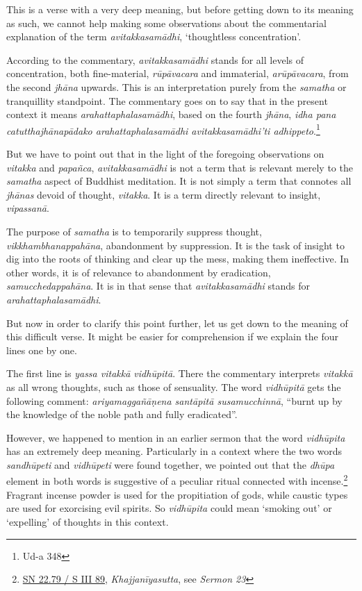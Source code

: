 This is a verse with a very deep meaning, but before getting down to its meaning as such, we cannot help making some observations about the commentarial explanation of the term \emph{avitakkasamādhi}, `thoughtless concentration'.

According to the commentary, \emph{avitakkasamādhi} stands for all levels of concentration, both fine-material, \emph{rūpāvacara} and immaterial, \emph{arūpāvacara}, from the second \emph{jhāna} upwards. This is an interpretation purely from the \emph{samatha} or tranquillity standpoint. The commentary goes on to say that in the present context it means \emph{arahattaphalasamādhi}, based on the fourth \emph{jhāna}, \emph{idha pana catutthajhānapādako arahattaphalasamādhi avitakkasamādhi'ti adhippeto}.\footnote{Ud-a 348}

But we have to point out that in the light of the foregoing observations on \emph{vitakka} and \emph{papañca}, \emph{avitakkasamādhi} is not a term that is relevant merely to the \emph{samatha} aspect of Buddhist meditation. It is not simply a term that connotes all \emph{jhānas} devoid of thought, \emph{vitakka}. It is a term directly relevant to insight, \emph{vipassanā}.

The purpose of \emph{samatha} is to temporarily suppress thought, \emph{vikkhambhanappahāna}, abandonment by suppression. It is the task of insight to dig into the roots of thinking and clear up the mess, making them ineffective. In other words, it is of relevance to abandonment by eradication, \emph{samucchedappahāna}. It is in that sense that \emph{avitakkasamādhi} stands for \emph{arahattaphalasamādhi}.

But now in order to clarify this point further, let us get down to the meaning of this difficult verse. It might be easier for comprehension if we explain the four lines one by one.

The first line is \emph{yassa vitakkā vidhūpitā}. There the commentary interprets \emph{vitakkā} as all wrong thoughts, such as those of sensuality. The word \emph{vidhūpitā} gets the following comment: \emph{ariyamaggañāṇena santāpitā susamucchinnā}, ``burnt up by the knowledge of the noble path and fully eradicated''.

However, we happened to mention in an earlier sermon that the word \emph{vidhūpita} has an extremely deep meaning. Particularly in a context where the two words \emph{sandhūpeti} and \emph{vidhūpeti} were found together, we pointed out that the \emph{dhūpa} element in both words is suggestive of a peculiar ritual connected with incense.\footnote{\href{https://suttacentral.net/sn22.79/pli/ms}{SN 22.79 / S III 89}, \emph{Khajjanīyasutta}, see \emph{Sermon 23}} Fragrant incense powder is used for the propitiation of gods, while caustic types are used for exorcising evil spirits. So \emph{vidhūpita} could mean `smoking out' or `expelling' of thoughts in this context.

